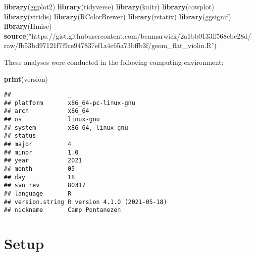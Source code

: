 \documentclass[]{book}
\newenvironment{Shaded}{\begin{snugshade}}{\end{snugshade}}
\newcommand{\KeywordTok}[1]{\textcolor[rgb]{0.13,0.29,0.53}{\textbf{#1}}}
\newcommand{\NormalTok}[1]{#1}
\newcommand{\StringTok}[1]{\textcolor[rgb]{0.31,0.60,0.02}{#1}}
\begin{document}
\begin{Shaded}
\begin{Highlighting}[]
\KeywordTok{library}\NormalTok{(ggplot2)}
\KeywordTok{library}\NormalTok{(tidyverse)}
\KeywordTok{library}\NormalTok{(knitr)}
\KeywordTok{library}\NormalTok{(cowplot)}
\KeywordTok{library}\NormalTok{(viridis)}
\KeywordTok{library}\NormalTok{(RColorBrewer)}
\KeywordTok{library}\NormalTok{(rstatix)}
\KeywordTok{library}\NormalTok{(ggsignif)}
\KeywordTok{library}\NormalTok{(Hmisc)}
\KeywordTok{source}\NormalTok{(}\StringTok{"https://gist.githubusercontent.com/benmarwick/2a1bb0133ff568cbe28d/raw/fb53bd97121f7f9ce947837ef1a4c65a73bffb3f/geom_flat_violin.R"}\NormalTok{)}
\end{Highlighting}
\end{Shaded}

These analyses were conducted in the following computing environment:

\begin{Shaded}
\begin{Highlighting}[]
\KeywordTok{print}\NormalTok{(version)}
\end{Highlighting}
\end{Shaded}

\begin{verbatim}
##                _                           
## platform       x86_64-pc-linux-gnu         
## arch           x86_64                      
## os             linux-gnu                   
## system         x86_64, linux-gnu           
## status                                     
## major          4                           
## minor          1.0                         
## year           2021                        
## month          05                          
## day            18                          
## svn rev        80317                       
## language       R                           
## version.string R version 4.1.0 (2021-05-18)
## nickname       Camp Pontanezen
\end{verbatim}

\hypertarget{setup-6}{%
\section{Setup}\label{setup-6}}
\end{document}
